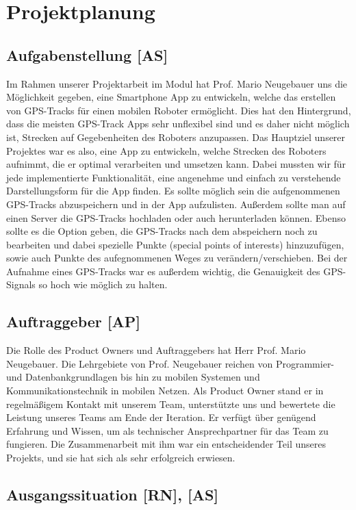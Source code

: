 \documentclass[10pt]{article}
\begin{document}
\section{Projektplanung}
\subsection{Aufgabenstellung [AS]}
    Im Rahmen unserer Projektarbeit im Modul  hat Prof. Mario Neugebauer uns die Möglichkeit gegeben,
    eine Smartphone App zu entwickeln, welche das erstellen von GPS-Tracks für einen mobilen 
    Roboter ermöglicht. Dies hat den Hintergrund, dass die meisten GPS-Track Apps sehr unflexibel sind und es daher nicht 
    möglich ist, Strecken auf Gegebenheiten des Roboters anzupassen. Das Hauptziel unserer Projektes war es also, eine App zu entwickeln, 
    welche Strecken des Roboters aufnimmt, die er optimal verarbeiten und umsetzen kann.
    Dabei mussten wir für jede implementierte Funktionalität,
    eine angenehme und einfach zu verstehende Darstellungsform für die App finden.
    Es sollte möglich sein die aufgenommenen GPS-Tracks abzuspeichern und in der App aufzulisten.
    Außerdem sollte man auf einen Server die GPS-Tracks hochladen oder auch herunterladen können.
    Ebenso sollte es die Option geben, die GPS-Tracks nach dem abspeichern noch zu bearbeiten und dabei spezielle Punkte (special points of interests) 
    hinzuzufügen, sowie auch Punkte des aufegnommenen Weges zu verändern/verschieben.
    Bei der Aufnahme eines GPS-Tracks war es außerdem wichtig, die Genauigkeit des GPS-Signals so hoch wie möglich zu halten. 
\subsection{Auftraggeber [AP]}
    Die Rolle des Product Owners und Auftraggebers hat Herr Prof. Mario Neugebauer. Die Lehrgebiete von Prof. Neugebauer
    reichen von Programmier- und Datenbankgrundlagen bis hin zu mobilen Systemen und Kommunikationstechnik in 
    mobilen Netzen. Als Product Owner stand er in regelmäßigem Kontakt mit unserem Team, unterstützte uns und
    bewertete die Leistung unseres Teams am Ende der Iteration. Er verfügt über genügend Erfahrung und Wissen,
    um als technischer Ansprechpartner für das Team zu fungieren. Die Zusammenarbeit mit ihm war ein entscheidender Teil 
    unseres Projekts, und sie hat sich als sehr erfolgreich erwiesen.

\subsection{Ausgangssituation [RN], [AS]}
\end{document}
